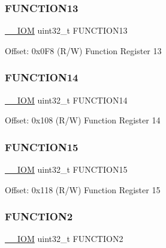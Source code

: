 \subsubsection{\texorpdfstring{F\+U\+N\+C\+T\+I\+O\+N13}{FUNCTION13}}
{\footnotesize\ttfamily \mbox{\hyperlink{core__cm4_8h_ab6caba5853a60a17e8e04499b52bf691}{\+\_\+\+\_\+\+I\+OM}} uint32\+\_\+t F\+U\+N\+C\+T\+I\+O\+N13}

Offset\+: 0x0\+F8 (R/W) Function Register 13 \mbox{\label{struct_d_w_t___type_aa11d2375486524bb0503fb100a5350af}} 
\subsubsection{\texorpdfstring{F\+U\+N\+C\+T\+I\+O\+N14}{FUNCTION14}}
{\footnotesize\ttfamily \mbox{\hyperlink{core__cm4_8h_ab6caba5853a60a17e8e04499b52bf691}{\+\_\+\+\_\+\+I\+OM}} uint32\+\_\+t F\+U\+N\+C\+T\+I\+O\+N14}

Offset\+: 0x108 (R/W) Function Register 14 \mbox{\label{struct_d_w_t___type_ac08524fa409351f1dedf993cc2d3b2b7}} 
\subsubsection{\texorpdfstring{F\+U\+N\+C\+T\+I\+O\+N15}{FUNCTION15}}
{\footnotesize\ttfamily \mbox{\hyperlink{core__cm4_8h_ab6caba5853a60a17e8e04499b52bf691}{\+\_\+\+\_\+\+I\+OM}} uint32\+\_\+t F\+U\+N\+C\+T\+I\+O\+N15}

Offset\+: 0x118 (R/W) Function Register 15 \mbox{\label{struct_d_w_t___type_a8ba3cc103077080ae3c0fc41e87d1197}} 
\subsubsection{\texorpdfstring{F\+U\+N\+C\+T\+I\+O\+N2}{FUNCTION2}}
{\footnotesize\ttfamily \mbox{\hyperlink{core__cm4_8h_ab6caba5853a60a17e8e04499b52bf691}{\+\_\+\+\_\+\+I\+OM}} uint32\+\_\+t F\+U\+N\+C\+T\+I\+O\+N2}

